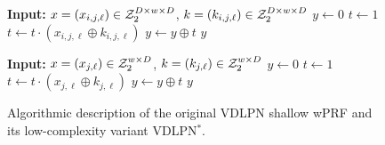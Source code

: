 \begin{figure}[ht]
\centering
\begin{minipage}[t]{0.47\textwidth}
\begin{algorithm}[H]
  \caption{\label{alg:vdlpn}The {\sf VDLPN} wPRF\\Parameters: Integers $w, D$}
  \begin{algorithmic}
   \State \textbf{Input:} $x = (x_{i,j,\ell}) \in \mathcal{Z}_2^{D \times w \times D}$, $k = (k_{i,j,\ell}) \in \mathcal{Z}_2^{D \times w \times D}$
    \State $y \gets 0$
        \State $t \gets 1$
          \State $t \gets t \cdot (x_{i,j,\ell} \oplus k_{i,j,\ell})$
        \EndFor
        \State $y \gets y \oplus t$
      \EndFor
    \EndFor
    \State \Return $y$
  \end{algorithmic}
\end{algorithm}
\end{minipage}
\hfill
\begin{minipage}[t]{0.47\textwidth}
\begin{algorithm}[H]
  \caption{\label{alg:vdlpn_simple}The {\sf VDLPN}$^*$ wPRF\\Parameters: Integers $w, D$}
  \begin{algorithmic}
    \State \textbf{Input:} $x = (x_{j,\ell}) \in \mathcal{Z}_2^{w\times D}$,  $k = (k_{j,\ell}) \in \mathcal{Z}_2^{w\times D}$
    \State $y \gets 0$
        \State $t \gets 1$
          \State $t \gets t \cdot (x_{j,\ell} \oplus k_{j,\ell})$
        \EndFor
        \State $y \gets y \oplus t$
      \EndFor
    \EndFor
    \State \Return $y$
  \end{algorithmic}
\end{algorithm}
\end{minipage}
\caption{Algorithmic description of the original {\sf VDLPN} shallow wPRF and its low-complexity variant {\sf VDLPN}$^*$.}
\end{figure}

